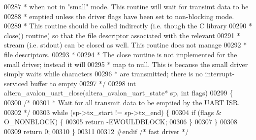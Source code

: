 \begin{DoxyCode}
00287 \textcolor{comment}{ * when not in "small" mode. This routine will wait for transimt data to be}
00288 \textcolor{comment}{ * emptied unless the driver flags have been set to non-blocking mode. }
00289 \textcolor{comment}{ * This routine should be called indirectly (i.e. though the C library }
00290 \textcolor{comment}{ * close() routine) so that the file descriptor associated with the relevant }
00291 \textcolor{comment}{ * stream (i.e. stdout) can be closed as well. This routine does not manage }
00292 \textcolor{comment}{ * file descriptors.}
00293 \textcolor{comment}{ * }
00294 \textcolor{comment}{ * The close routine is not implemented for the small driver; instead it will}
00295 \textcolor{comment}{ * map to null. This is because the small driver simply waits while characters}
00296 \textcolor{comment}{ * are transmitted; there is no interrupt-serviced buffer to empty }
00297 \textcolor{comment}{ */}
00298 \textcolor{keywordtype}{int} altera_avalon_uart_close(altera_avalon_uart_state* sp, \textcolor{keywordtype}{int} flags)
00299 \{
00300   \textcolor{comment}{/* }
00301 \textcolor{comment}{   * Wait for all transmit data to be emptied by the UART ISR.}
00302 \textcolor{comment}{   */}
00303   \textcolor{keywordflow}{while} (sp->tx_start != sp->tx_end) \{
00304     \textcolor{keywordflow}{if} (flags & O\_NONBLOCK) \{
00305       \textcolor{keywordflow}{return} -EWOULDBLOCK; 
00306     \}
00307   \}
00308 
00309   \textcolor{keywordflow}{return} 0;
00310 \}
00311 
00312 \textcolor{preprocessor}{#endif }\textcolor{comment}{/* fast driver */}\textcolor{preprocessor}{}
\end{DoxyCode}
